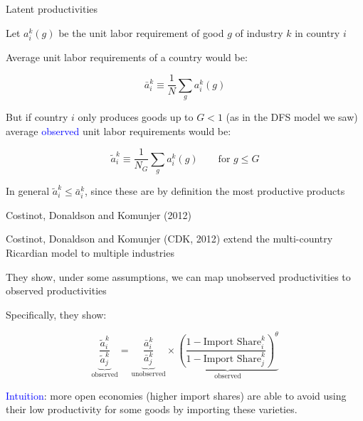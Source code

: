 \documentclass[notes,11pt, aspectratio=169, xcolor=table]{beamer}
\newcommand{\blue}[1]{\textcolor{blue}{#1}}
\newenvironment{wideitemize}{\itemize\addtolength{\itemsep}{10pt}}{\enditemize}
\begin{document}
\begin{frame}{Latent productivities}
\begin{wideitemize}
    \item Let $a_i^k(g)$ be the unit labor requirement of good $g$ of industry $k$ in country $i$

    \item Average unit labor requirements of a country would be: 

    \begin{equation*}
        \bar{a}_i^k \equiv \frac{1}{N} \sum_g  a_i^k(g)
    \end{equation*}

    \item But if country $i$ only produces goods up to $G < 1$ (as in the DFS model we saw) average \blue{observed} unit labor requirements would be:

        \begin{equation*}
        \tilde{a}_i^k \equiv \frac{1}{N_G} \sum_g  a_i^k(g) \qquad \text{for } g \le G  
    \end{equation*}

    \item In general $\tilde{a}_i^k \le \bar{a}_i^k$, since these are by definition the most productive products

    
\end{wideitemize}

\end{frame}

\begin{frame}{Costinot, Donaldson and Komunjer (2012)}
\begin{wideitemize}
    \item Costinot, Donaldson and Komunjer (CDK, 2012) extend the multi-country Ricardian model to multiple industries

    \item They show, under some assumptions, we can map unobserved productivities to observed productivities

    \item Specifically, they show:

    \begin{equation*}
        \underbrace{\frac{\tilde{a}_i^k}{\tilde{a}_j^k}}_{\text{observed}} = \underbrace{\frac{\bar{a}_i^k}{\bar{a}_j^k}}_{\text{unobserved}} \times \underbrace{\left(\frac{1-\text{Import Share}_i^k}{1-\text{Import Share}_j^k}\right)^\theta}_{\text{observed}} 
    \end{equation*}

    \blue{Intuition}: more open economies (higher import shares) are able to avoid using their low productivity for some goods by importing these varieties.
    
\end{wideitemize}

\end{frame}
\end{document}
